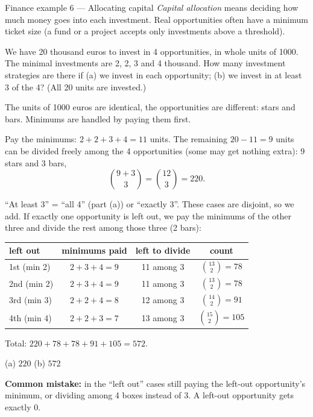\begin{fin}{Finance example 6 --- Allocating capital}
	\context \emph{Capital allocation} means deciding how much money goes into
	each investment. Real opportunities often have a minimum ticket size (a
	fund or a project accepts only investments above a threshold).

	We have 20 thousand euros to invest in 4 opportunities, in whole units of
	1000. The minimal investments are 2, 2, 3 and 4 thousand. How many
	investment strategies are there if (a) we invest in each opportunity;
	(b) we invest in at least 3 of the 4? (All 20 units are invested.)
\end{fin}
\workspace{4cm}

\ifsolutions
	\soltitle
	\idea The units of 1000 euros are identical, the opportunities are
	different: stars and bars. Minimums are handled by paying them first.

	 Pay the minimums: $2+2+3+4=11$ units. The remaining $20-11=9$
	units can be divided freely among the 4 opportunities (some may get nothing
	extra): 9 stars and 3 bars,
	\[ \binom{9+3}{3}=\binom{12}{3}=220. \]

	 ``At least 3'' = ``all 4'' (part (a)) or ``exactly 3''. These
	cases are disjoint, so we add. If exactly one opportunity is left out, we pay
	the minimums of the other three and divide the rest among those three
	(2 bars):
	\begin{center}
		\begin{tabular}{lccc}\toprule
			left out    & minimums paid & left to divide & count               \\\midrule
			1st (min 2) & $2+3+4=9$     & 11 among 3     & $\binom{13}{2}=78$  \\
			2nd (min 2) & $2+3+4=9$     & 11 among 3     & $\binom{13}{2}=78$  \\
			3rd (min 3) & $2+2+4=8$     & 12 among 3     & $\binom{14}{2}=91$  \\
			4th (min 4) & $2+2+3=7$     & 13 among 3     & $\binom{15}{2}=105$ \\\bottomrule
		\end{tabular}
	\end{center}
	Total: $220+78+78+91+105=572$.
	\begin{answer}
		(a) $220$ \qquad (b) $572$
	\end{answer}
	\begin{remark}
		\textbf{Common mistake:} in the ``left out'' cases still paying the left-out
		opportunity's minimum, or dividing among 4 boxes instead of 3. A left-out
		opportunity gets exactly $0$.
	\end{remark}
\fi

